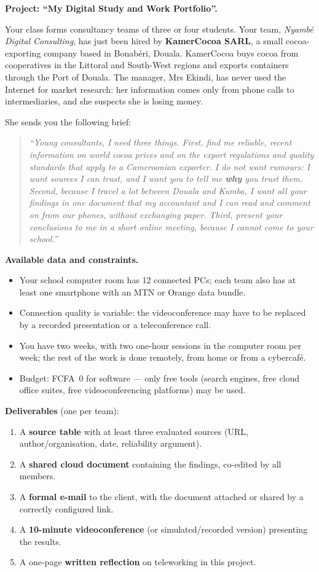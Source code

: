 \documentclass[11pt]{article}
\newcounter{popsec}
\newcounter{popsub}
\newcommand{\courssub}[1]{%
  \stepcounter{popsub}%
  \par\vspace{9pt}\noindent{\popxbold\fontsize{11.5}{13}\selectfont\color{popink}{\color{poporange}\thepopsec.\thepopsub}\hspace{6pt}#1}\par\nopagebreak\vspace{4pt}
}
\begin{document}
\courssub{Situation}

\textbf{Project: ``My Digital Study and Work Portfolio''.}\par
Your class forms consultancy teams of three or four students. Your team, \emph{Nyambé Digital Consulting}, has just been hired by \textbf{KamerCocoa SARL}, a small cocoa-exporting company based in Bonabéri, Douala. KamerCocoa buys cocoa from cooperatives in the Littoral and South-West regions and exports containers through the Port of Douala. The manager, Mrs Ekindi, has never used the Internet for market research: her information comes only from phone calls to intermediaries, and she suspects she is losing money.

She sends you the following brief:

\begin{quote}
\emph{``Young consultants, I need three things. First, find me reliable, recent information on world cocoa prices and on the export regulations and quality standards that apply to a Cameroonian exporter. I do not want rumours: I want sources I can trust, and I want you to tell me \textbf{why} you trust them. Second, because I travel a lot between Douala and Kumba, I want all your findings in one document that my accountant and I can read and comment on from our phones, without exchanging paper. Third, present your conclusions to me in a short online meeting, because I cannot come to your school.''}
\end{quote}

\textbf{Available data and constraints.}
\begin{itemize}
\item Your school computer room has 12 connected PCs; each team also has at least one smartphone with an MTN or Orange data bundle.
\item Connection quality is variable: the videoconference may have to be replaced by a recorded presentation or a teleconference call.
\item You have two weeks, with two one-hour sessions in the computer room per week; the rest of the work is done remotely, from home or from a cybercafé.
\item Budget: FCFA~0 for software — only free tools (search engines, free cloud office suites, free videoconferencing platforms) may be used.
\end{itemize}

\textbf{Deliverables} (one per team):
\begin{enumerate}
\item A \textbf{source table} with at least three evaluated sources (URL, author/organisation, date, reliability argument).
\item A \textbf{shared cloud document} containing the findings, co-edited by all members.
\item A \textbf{formal e-mail} to the client, with the document attached or shared by a correctly configured link.
\item A \textbf{10-minute videoconference} (or simulated/recorded version) presenting the results.
\item A one-page \textbf{written reflection} on teleworking in this project.
\end{enumerate}
\end{document}
